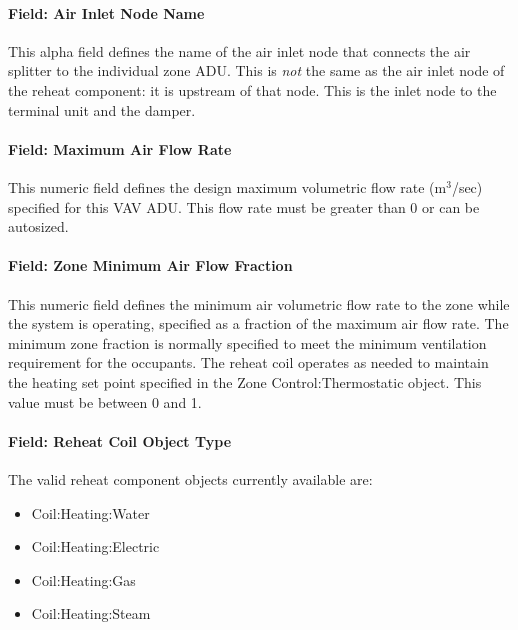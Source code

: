 \paragraph{Field: Air Inlet Node Name}\label{field-air-inlet-node-name-3}

This alpha field defines the name of the air inlet node that connects the air splitter to the individual zone ADU. This is \emph{not} the same as the air inlet node of the reheat component: it is upstream of that node. This is the inlet node to the terminal unit and the damper.

\paragraph{Field: Maximum Air Flow Rate}\label{field-maximum-air-flow-rate-3}

This numeric field defines the design maximum volumetric flow rate (m\(^{3}\)/sec) specified for this VAV ADU. This flow rate must be greater than 0 or can be autosized.

\paragraph{Field: Zone Minimum Air Flow Fraction}\label{field-zone-minimum-air-flow-fraction-1}

This numeric field defines the minimum air volumetric flow rate to the zone while the system is operating, specified as a fraction of the maximum air flow rate. The minimum zone fraction is normally specified to meet the minimum ventilation requirement for the occupants. The reheat coil operates as needed to maintain the heating set point specified in the Zone Control:Thermostatic object. This value must be between 0 and 1.

\paragraph{Field: Reheat Coil Object Type}\label{field-reheat-coil-object-type-2}

The valid reheat component objects currently available are:

\begin{itemize}
\item
  Coil:Heating:Water
\item
  Coil:Heating:Electric
\item
  Coil:Heating:Gas
\item
  Coil:Heating:Steam
\end{itemize}

